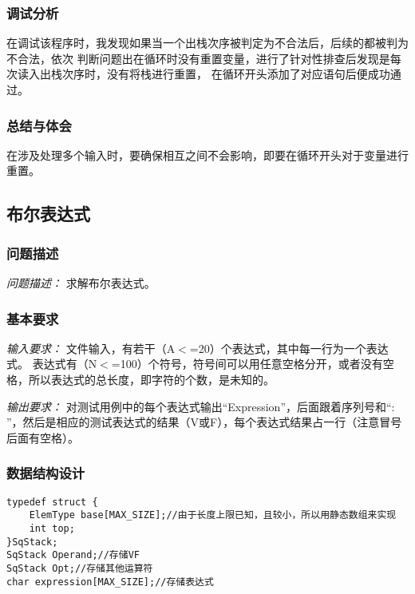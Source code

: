 \documentclass[a4paper,11pt]{article}%
\newenvironment{shadedquotation}
 {\begin{shaded*}
  \quoting[leftmargin=0pt, vskip=0pt]
 }
 {\endquoting
 \end{shaded*}
}
\begin{document}
\subsubsection{调试分析}
在调试该程序时，我发现如果当一个出栈次序被判定为不合法后，后续的都被判为不合法，依次
判断问题出在循环时没有重置变量，进行了针对性排查后发现是每次读入出栈次序时，没有将栈进行重置，
在循环开头添加了对应语句后便成功通过。
\subsubsection{总结与体会}
在涉及处理多个输入时，要确保相互之间不会影响，即要在循环开头对于变量进行重置。
\subsection{布尔表达式}
\subsubsection{问题描述}
\begin{shadedquotation}
    \emph{问题描述：}
    求解布尔表达式。
\end{shadedquotation}
\subsubsection{基本要求}
\begin{shadedquotation}
    \emph{输入要求：}
    文件输入，有若干（A$<$=20）个表达式，其中每一行为一个表达式。 表达式有（N$<$=100）个符号，符号间可以用任意空格分开，或者没有空格，所以表达式的总长度，即字符的个数，是未知的。
\end{shadedquotation}
\begin{shadedquotation}
    \emph{输出要求：}
    对测试用例中的每个表达式输出“Expression”，后面跟着序列号和“: ”，然后是相应的测试表达式的结果（V或F），每个表达式结果占一行（注意冒号后面有空格）。
\end{shadedquotation}
\subsubsection{数据结构设计}
\begin{lstlisting}[language={[ANSI]C},keywordstyle=\color{blue!70},commentstyle=\color{red!50!green!50!blue!50},frame=shadowbox,
				rulesepcolor=\color{red!20!green!20!blue!20}]
typedef struct {
	ElemType base[MAX_SIZE];//由于长度上限已知，且较小，所以用静态数组来实现
	int top;
}SqStack;
SqStack Operand;//存储VF
SqStack Opt;//存储其他运算符
char expression[MAX_SIZE];//存储表达式
\end{lstlisting}
\end{document}
